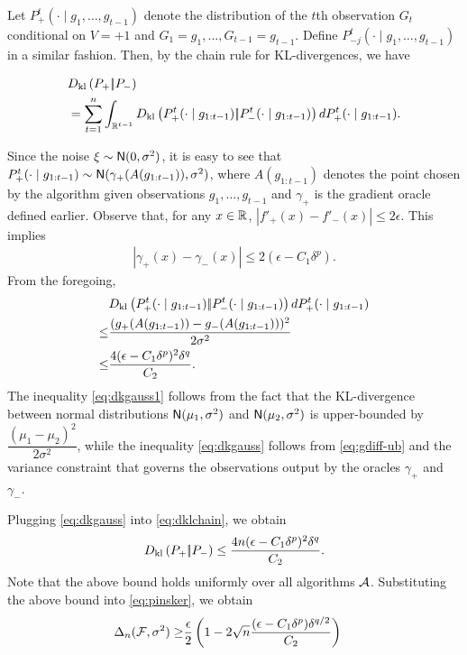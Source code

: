 Let $P_{+}^t(\cdot\mid g_1,\ldots,g_{t-1})$ denote the distribution of the $t$th observation $G_t$ conditional on $V=+1$ and $G_1=g_1,\ldots,G_{t-1}=g_{t-1}$. Define  $P_{-j}^t(\cdot\mid g_1,\ldots,g_{t-1})$ in a similar fashion.
Then, by the chain rule for KL-divergences, we have
\begin{scriptsize}
\begin{align}
&D_{\rm kl}\left({P_{+}} |\!| {P_{-}} \right)\label{eq:dklchain}\\ 
&= \sum_{t=1}^n \int_{\mathbb{R}^{t-1}} D_{\rm kl}\left({P_{+}^t(\cdot\mid g_{1:t-1})} |\!| {P_{-}^t(\cdot\mid g_{1:t-1})} \right) d P_{+}^t(\cdot\mid g_{1:t-1}).\nonumber
\end{align}
\end{scriptsize}
Since the noise $\xi \sim \mathsf{N}(0,\sigma^2)$, it is easy to see that $P_{+}^t(\cdot\mid g_{1:t-1}) \sim \mathsf{N}(\gamma_{+}(A(g_{1:t-1})),\sigma^2)$, where $A(g_{1:t-1})$ denotes the point chosen by the algorithm given observations $g_1,\ldots, g_{t-1}$ and $\gamma_{+}$ is the gradient oracle defined earlier. 
Observe that, for any $x\in \mathbb{R}$, $
 |f'_+(x) - f'_-(x)| \le 2 \epsilon.$ This implies 
 \begin{align}
 |\gamma_+(x) - \gamma_-(x)| \le 2(\epsilon-C_1\delta^p).  \label{eq:gdiff-ub}
 \end{align}
From the foregoing, 
\begin{align}
 &D_{\rm kl}\left({P_{+}^t(\cdot\mid g_{1:t-1})} |\!| {P_{-}^t(\cdot\mid g_{1:t-1})} \right) d P_{+}^t(\cdot\mid g_{1:t-1}) \nonumber\\
 \le&\dfrac{(g_{+}(A(g_{1:t-1})) - g_{-}(A(g_{1:t-1})))^2}{2 \sigma^2}\label{eq:dkgauss1}\\
 \le& \dfrac{4(\epsilon-C_1\delta^p)^2\delta^q}{C_2}.\label{eq:dkgauss}
\end{align}
The inequality \eqref{eq:dkgauss1} follows from the fact that the KL-divergence between normal distributions $\mathsf{N}(\mu_1,\sigma^2)$ and $\mathsf{N}(\mu_2,\sigma^2)$ is upper-bounded by $\dfrac{(\mu_1 - \mu_2)^2}{2 \sigma^2}$, while the inequality \eqref{eq:dkgauss} follows from \eqref{eq:gdiff-ub} and the variance constraint that governs the observations output by the oracles $\gamma_+$ and $\gamma_-$.

Plugging \eqref{eq:dkgauss} into \eqref{eq:dklchain}, we obtain
\begin{align}
D_{\rm kl}\left({P_{+}} |\!| {P_{-}} \right) \le \dfrac{4n(\epsilon-C_1\delta^p)^2 \delta^q}{C_2}.\label{eq:dkbd}
\end{align}
Note that the above bound holds uniformly over all algorithms $\mathcal{A}$. 
Substituting the above bound into \eqref{eq:pinsker}, we obtain
\begin{align}
 \Delta_n(\mathcal{F}, \sigma^2) 
  \ge & \dfrac{\epsilon}{2} \left(1 - 2\sqrt{
    n}  \dfrac{(\epsilon-C_1\delta^p)\delta^{q/2}}{C_2}
  \right)\label{eq:final-lower-bd}
\end{align}

